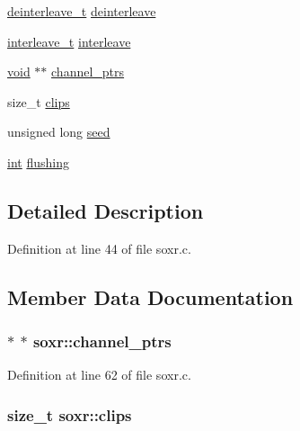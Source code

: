 \begin{DoxyCompactItemize}
\item 
\hyperlink{soxr_8c_ae38d1593aaf4055ec74e7908e15f941a}{deinterleave\+\_\+t} \hyperlink{structsoxr_a5628a132543e83108ce76ac059f85a9f}{deinterleave}
\item 
\hyperlink{soxr_8c_a5a5f4f8a0be6b57c9c9d4104728499e4}{interleave\+\_\+t} \hyperlink{structsoxr_ac359ffb418677833569b7c8faeea8e62}{interleave}
\item 
\hyperlink{sound_8c_ae35f5844602719cf66324f4de2a658b3}{void} $\ast$$\ast$ \hyperlink{structsoxr_ace64c1784e42f0efbd1afdc2eab6b095}{channel\+\_\+ptrs}
\item 
size\+\_\+t \hyperlink{structsoxr_ab60ab840ebac4faebf2cb2f30b10818b}{clips}
\item 
unsigned long \hyperlink{structsoxr_ab8b3d69d3f6c62f18cb464594b19d078}{seed}
\item 
\hyperlink{xmltok_8h_a5a0d4a5641ce434f1d23533f2b2e6653}{int} \hyperlink{structsoxr_af68d052dcfcdb459b273fdf8e6b234a4}{flushing}
\end{DoxyCompactItemize}


\subsection{Detailed Description}


Definition at line 44 of file soxr.\+c.



\subsection{Member Data Documentation}
\subsubsection[{\texorpdfstring{channel\+\_\+ptrs}{channel_ptrs}}]{$\ast$ $\ast$ soxr\+::channel\+\_\+ptrs}\hypertarget{structsoxr_ace64c1784e42f0efbd1afdc2eab6b095}{}\label{structsoxr_ace64c1784e42f0efbd1afdc2eab6b095}


Definition at line 62 of file soxr.\+c.

\subsubsection[{\texorpdfstring{clips}{clips}}]{\setlength{\rightskip}{0pt plus 5cm}size\+\_\+t soxr\+::clips}\hypertarget{structsoxr_ab60ab840ebac4faebf2cb2f30b10818b}{}\label{structsoxr_ab60ab840ebac4faebf2cb2f30b10818b}


